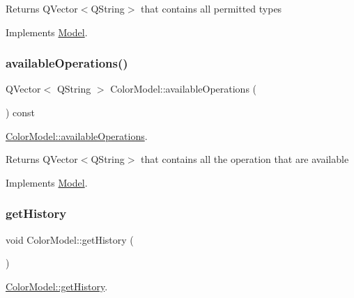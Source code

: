 \begin{DoxyReturn}{Returns}
Q\+Vector$<$\+Q\+String$>$ that contains all permitted types 
\end{DoxyReturn}


Implements \hyperlink{class_model}{Model}.

\mbox{\label{class_color_model_aab6a725338946ecec218220f5606be45}} 
\subsubsection{\texorpdfstring{available\+Operations()}{availableOperations()}}
{\footnotesize\ttfamily Q\+Vector$<$ Q\+String $>$ Color\+Model\+::available\+Operations (\begin{DoxyParamCaption}{ }\end{DoxyParamCaption}) const\hspace{0.3cm}{\ttfamily [virtual]}}



\hyperlink{class_color_model_aab6a725338946ecec218220f5606be45}{Color\+Model\+::available\+Operations}. 

\begin{DoxyReturn}{Returns}
Q\+Vector$<$\+Q\+String$>$ that contains all the operation that are available 
\end{DoxyReturn}


Implements \hyperlink{class_model}{Model}.

\mbox{\label{class_color_model_a90bcf6ca5b8d00a14a8153970594de97}} 
\subsubsection{\texorpdfstring{get\+History}{getHistory}}
{\footnotesize\ttfamily void Color\+Model\+::get\+History (\begin{DoxyParamCaption}{ }\end{DoxyParamCaption})\hspace{0.3cm}{\ttfamily [slot]}}



\hyperlink{class_color_model_a90bcf6ca5b8d00a14a8153970594de97}{Color\+Model\+::get\+History}. 

